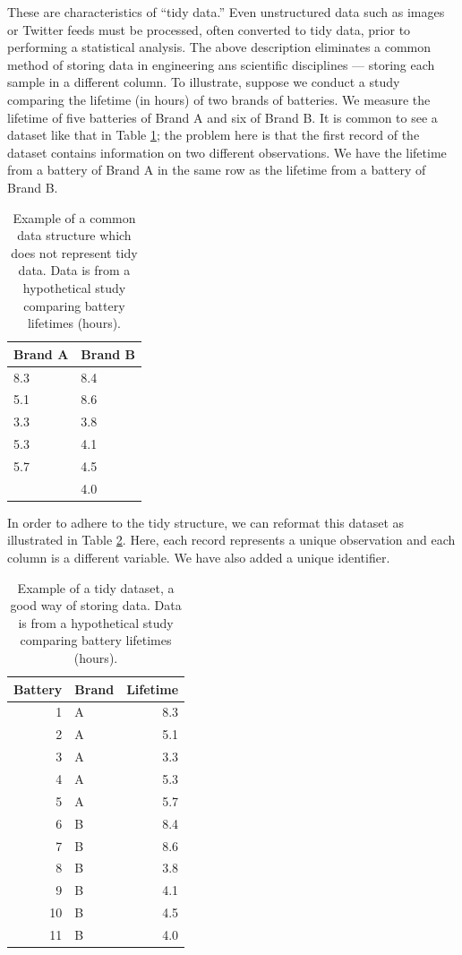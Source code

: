 \documentclass[]{book}
\theoremstyle{definition}
\theoremstyle{definition}
\theoremstyle{remark}
\begin{document}
These are characteristics of ``tidy data.'' Even unstructured data such
as images or Twitter feeds must be processed, often converted to tidy
data, prior to performing a statistical analysis. The above description
eliminates a common method of storing data in engineering ans scientific
disciplines --- storing each sample in a different column. To
illustrate, suppose we conduct a study comparing the lifetime (in hours)
of two brands of batteries. We measure the lifetime of five batteries of
Brand A and six of Brand B. It is common to see a dataset like that in
Table \ref{tab:basics-poor-dataset}; the problem here is that the first
record of the dataset contains information on two different
observations. We have the lifetime from a battery of Brand A in the same
row as the lifetime from a battery of Brand B.

\begin{table}

\caption{\label{tab:basics-poor-dataset}Example of a common data structure which does not represent tidy data.  Data is from a hypothetical study comparing battery lifetimes (hours).}
\centering
\begin{tabular}[t]{l|l}
\hline
Brand A & Brand B\\
\hline
8.3 & 8.4\\
\hline
5.1 & 8.6\\
\hline
3.3 & 3.8\\
\hline
5.3 & 4.1\\
\hline
5.7 & 4.5\\
\hline
 & 4.0\\
\hline
\end{tabular}
\end{table}

In order to adhere to the tidy structure, we can reformat this dataset
as illustrated in Table \ref{tab:basics-good-dataset}. Here, each record
represents a unique observation and each column is a different variable.
We have also added a unique identifier.

\begin{table}

\caption{\label{tab:basics-good-dataset}Example of a tidy dataset, a good way of storing data.  Data is from a hypothetical study comparing battery lifetimes (hours).}
\centering
\begin{tabular}[t]{r|l|r}
\hline
Battery & Brand & Lifetime\\
\hline
1 & A & 8.3\\
\hline
2 & A & 5.1\\
\hline
3 & A & 3.3\\
\hline
4 & A & 5.3\\
\hline
5 & A & 5.7\\
\hline
6 & B & 8.4\\
\hline
7 & B & 8.6\\
\hline
8 & B & 3.8\\
\hline
9 & B & 4.1\\
\hline
10 & B & 4.5\\
\hline
11 & B & 4.0\\
\hline
\end{tabular}
\end{table}
\end{document}
